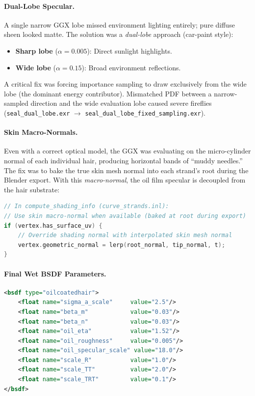 \documentclass[11pt]{article}
\begin{document}
\paragraph{Dual-Lobe Specular.}
A single narrow GGX lobe missed environment lighting entirely; pure diffuse sheen looked matte. The solution was a \emph{dual-lobe} approach (car-paint style):
\begin{itemize}
    \item \textbf{Sharp lobe} ($\alpha = 0.005$): Direct sunlight highlights.
    \item \textbf{Wide lobe} ($\alpha = 0.15$): Broad environment reflections.
\end{itemize}
A critical fix was forcing importance sampling to draw exclusively from the wide lobe (the dominant energy contributor). Mismatched PDF between a narrow-sampled direction and the wide evaluation lobe caused severe fireflies (\texttt{seal\_dual\_lobe.exr} $\to$ \texttt{seal\_dual\_lobe\_fixed\_sampling.exr}).

\paragraph{Skin Macro-Normals.}
Even with a correct optical model, the GGX was evaluating on the micro-cylinder normal of each individual hair, producing horizontal bands of ``muddy needles.'' The fix was to bake the true skin mesh normal into each strand's root during the Blender export. With this \emph{macro-normal}, the oil film specular is decoupled from the hair substrate:
\begin{lstlisting}[language=C++]
// In compute_shading_info (curve_strands.inl):
// Use skin macro-normal when available (baked at root during export)
if (vertex.has_surface_uv) {
    // Override shading normal with interpolated skin mesh normal
    vertex.geometric_normal = lerp(root_normal, tip_normal, t);
}
\end{lstlisting}

\paragraph{Final Wet BSDF Parameters.}
\begin{lstlisting}[language=XML]
<bsdf type="oilcoatedhair">
    <float name="sigma_a_scale"     value="2.5"/>
    <float name="beta_m"            value="0.03"/>
    <float name="beta_n"            value="0.03"/>
    <float name="oil_eta"           value="1.52"/>
    <float name="oil_roughness"     value="0.005"/>
    <float name="oil_specular_scale" value="18.0"/>
    <float name="scale_R"           value="1.0"/>
    <float name="scale_TT"          value="2.0"/>
    <float name="scale_TRT"         value="0.1"/>
</bsdf>
\end{lstlisting}
\end{document}
